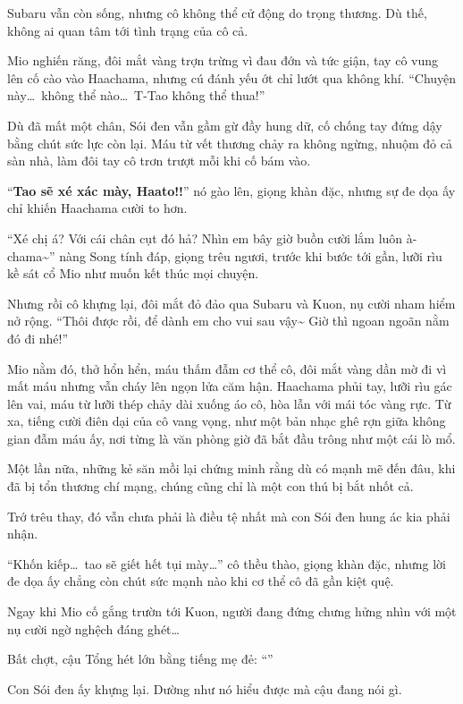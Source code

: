 \documentclass[../main.tex]{subfiles}
\begin{document}
Subaru vẫn còn sống, nhưng cô không thể cử động do trọng thương. Dù thế, không ai quan tâm tới tình trạng của cô cả.

Mio nghiến răng, đôi mắt vàng trợn trừng vì đau đớn và tức giận, tay cô vung lên cố cào vào Haachama, nhưng cú đánh yếu ớt chỉ lướt qua không khí. ``Chuyện này\dots\ không thể nào\dots\ T-Tao không thể thua!''

Dù đã mất một chân, Sói đen vẫn gầm gừ đầy hung dữ, cố chống tay đứng dậy bằng chút sức lực còn lại. Máu từ vết thương chảy ra không ngừng, nhuộm đỏ cả sàn nhà, làm đôi tay cô trơn trượt mỗi khi cố bám vào.

``\textbf{Tao sẽ xé xác mày, Haato!!}'' nó gào lên, giọng khàn đặc, nhưng sự đe dọa ấy chỉ khiến Haachama cười to hơn.

``Xé chị á? Với cái chân cụt đó hả? Nhìn em bây giờ buồn cười lắm luôn à-chama\~{}'' nàng Song tính đáp, giọng trêu ngươi, trước khi bước tới gần, lưỡi rìu kề sát cổ Mio như muốn kết thúc mọi chuyện.

Nhưng rồi cô khựng lại, đôi mắt đỏ đảo qua Subaru và Kuon, nụ cười nham hiểm nở rộng. ``Thôi được rồi, để dành em cho vui sau vậy\~{} Giờ thì ngoan ngoãn nằm đó đi nhé!''

Mio nằm đó, thở hổn hển, máu thấm đẫm cơ thể cô, đôi mắt vàng dần mờ đi vì mất máu nhưng vẫn cháy lên ngọn lửa căm hận. Haachama phủi tay, lưỡi rìu gác lên vai, máu từ lưỡi thép chảy dài xuống áo cô, hòa lẫn với mái tóc vàng rực. Từ xa, tiếng cười điên dại của cô vang vọng, như một bản nhạc ghê rợn giữa không gian đẫm máu ấy, nơi từng là văn phòng giờ đã bắt đầu trông như một cái lò mổ.

Một lần nữa, những kẻ săn mồi lại chứng minh rằng dù có mạnh mẽ đến đâu, khi đã bị tổn thương chí mạng, chúng cũng chỉ là một con thú bị bắt nhốt cả.

Trớ trêu thay, đó vẫn chưa phải là điều tệ nhất mà con Sói đen hung ác kia phải nhận.

``Khốn kiếp\dots\ tao sẽ giết hết tụi mày\dots'' cô thều thào, giọng khàn đặc, nhưng lời đe dọa ấy chẳng còn chút sức mạnh nào khi cơ thể cô đã gần kiệt quệ.

Ngay khi Mio cố gắng trườn tới Kuon, người đang đứng chưng hửng nhìn với một nụ cười ngờ nghệch đáng ghét\dots

Bất chợt, cậu Tổng hét lớn bằng tiếng mẹ đẻ: ``\textbf{}''

Con Sói đen ấy khựng lại. Dường như nó hiểu được mà cậu đang nói gì.
\end{document}

